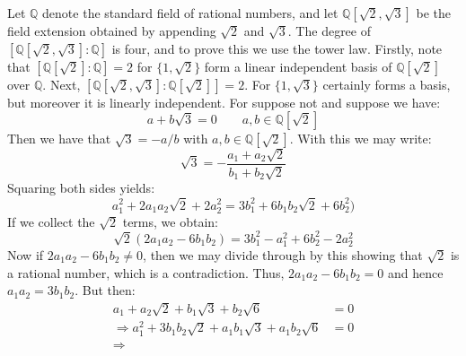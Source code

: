 \documentclass{article}                                                        %
\begin{document}
        \begin{example}
            Let $\mathbb{Q}$ denote the standard field of rational numbers, and
            let $\mathbb{Q}[\sqrt{2},\sqrt{3}]$ be the field extension obtained
            by appending $\sqrt{2}$ and $\sqrt{3}$. The degree of
            $[\mathbb{Q}[\sqrt{2},\sqrt{3}]:\mathbb{Q}]$ is four, and to prove
            this we use the tower law. Firstly, note that
            $[\mathbb{Q}[\sqrt{2}]:\mathbb{Q}]=2$ for $\{1,\sqrt{2}\}$ form a
            linear independent basis of $\mathbb{Q}[\sqrt{2}]$ over
            $\mathbb{Q}$. Next,
            $[\mathbb{Q}[\sqrt{2},\sqrt{3}]:\mathbb{Q}[\sqrt{2}]]=2$. For
            $\{1,\sqrt{3}\}$ certainly forms a basis, but moreover it is
            linearly independent. For suppose not and suppose we have:
            \begin{equation}
                a+b\sqrt{3}=0\quad\quad
                a,b\in\mathbb{Q}[\sqrt{2}]
            \end{equation}
            Then we have that $\sqrt{3}=\minus{a}/b$ with
            $a,b\in\mathbb{Q}[\sqrt{2}]$. With this we may write:
            \begin{equation}
                \sqrt{3}=\minus\frac{a_{1}+a_{2}\sqrt{2}}{b_{1}+b_{2}\sqrt{2}}
            \end{equation}
            Squaring both sides yields:
            \begin{equation}
                a_{1}^{2}+2a_{1}a_{2}\sqrt{2}+2a_{2}^{2}=
                3b_{1}^{2}+6b_{1}b_{2}\sqrt{2}+6b_{2}^{2})
            \end{equation}
            If we collect the $\sqrt{2}$ terms, we obtain:
            \begin{equation}
                \sqrt{2}(2a_{1}a_{2}-6b_{1}b_{2})=
                3b_{1}^{2}-a_{1}^{2}+6b_{2}^{2}-2a_{2}^{2}
            \end{equation}
            Now if $2a_{1}a_{2}-6b_{1}b_{2}\ne{0}$, then we may divide through
            by this showing that $\sqrt{2}$ is a rational number, which is a
            contradiction. Thus, $2a_{1}a_{2}-6b_{1}b_{2}=0$ and hence
            $a_{1}a_{2}=3b_{1}b_{2}$. But then:
            \begin{align}
                a_{1}+a_{2}\sqrt{2}+b_{1}\sqrt{3}+b_{2}\sqrt{6}&=0\\
                \Rightarrow
                a_{1}^{2}+3b_{1}b_{2}\sqrt{2}
                    +a_{1}b_{1}\sqrt{3}+a_{1}b_{2}\sqrt{6}&=0\\
                \Rightarrow
            \end{align}
        \end{example}
\end{document}
